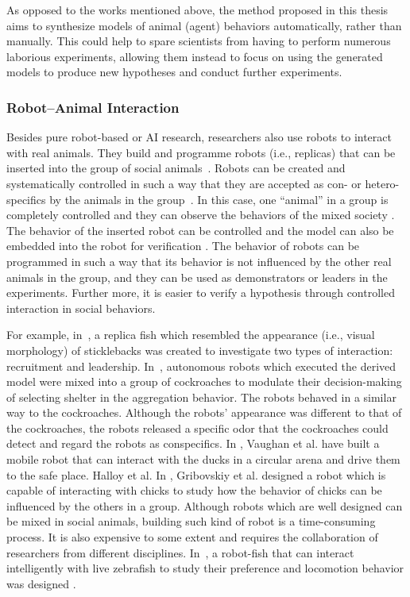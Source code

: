 As opposed to the works mentioned above, the method proposed in this thesis aims to synthesize models of animal (agent) behaviors automatically, rather than manually. This could help to spare scientists from having to perform numerous laborious experiments, allowing them instead to focus on using the generated models to produce new hypotheses and conduct further experiments. 

\subsubsection{Robot--Animal Interaction}\label{sec:robot_animal_interaction}

Besides pure robot-based or AI research, researchers also use robots to interact with real animals. They build and programme robots (i.e., replicas) that can be inserted into the group of social animals~\cite{Faria2010, Halloy2013, J.Halloy2007, Thomas2013, Vaughan2000}. Robots can be created and systematically controlled in such a way that they are accepted as con- or hetero-specifics by the animals in the group~\cite{Krause2011}. In this case, one ``animal'' in a group is completely controlled and they can observe the behaviors of the mixed society \cite{J.Halloy_2007}. The behavior of the inserted robot can be controlled and the model can also be embedded into the robot for verification \cite{Krause_2011}. The behavior of robots can be programmed in such a way that its behavior is not influenced by the other real animals in the group, and they can be used as demonstrators or leaders in the experiments. Further more, it is easier to verify a hypothesis through controlled interaction in social behaviors. 

For example,  in~\cite{Faria2010}, a replica fish which resembled the appearance (i.e., visual morphology) of sticklebacks was created to investigate two types of interaction: recruitment and leadership. In~\cite{J.Halloy2007}, autonomous robots which executed the derived model were mixed into a group of cockroaches to modulate their decision-making of selecting shelter in the aggregation behavior. The robots behaved in a similar way to the cockroaches. Although the robots' appearance was different to that of the cockroaches, the robots released a specific odor that the cockroaches could detect and regard the robots as conspecifics. In \cite{Vaughan_1998, Vaughan2000}, Vaughan et al. have built a mobile robot that can interact with the ducks in a circular arena and drive them to the safe place. Halloy et al. In \cite{Gribovskiy_2010}, Gribovskiy et al. designed a robot which is capable of interacting with chicks to study how the behavior of chicks can be influenced by the others in a group. Although robots which are well designed can be mixed in social animals, building such kind of robot is a time-consuming process. It is also expensive to some extent and requires the collaboration of researchers from different disciplines. In~\citep{Kopman2013}, a robot-fish that can interact intelligently with live zebrafish to study their preference and locomotion behavior was designed . 

